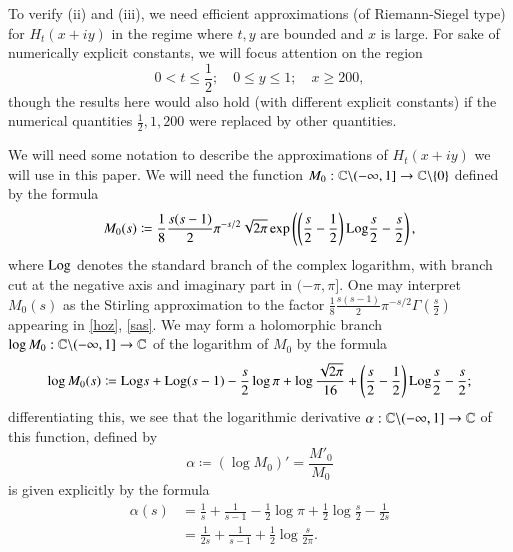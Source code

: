 To verify (ii) and (iii), we need efficient approximations (of Riemann-Siegel type) for $H_t(x+iy)$ in the regime where $t,y$ are bounded and $x$ is large.  For sake of numerically explicit constants, we will focus attention on the region
\begin{equation}\label{region}
0 < t \leq \frac{1}{2}; \quad 0 \leq y \leq 1; \quad x \geq 200,
\end{equation}
though the results here would also hold (with different explicit constants) if the numerical quantities $\frac{1}{2}, 1, 200$ were replaced by other quantities.

We will need some notation to describe the approximations of $H_t(x+iy)$ we will use in this paper.    We will need the function $M_0: \mathbb{C} \backslash (-\infty,1] \to \mathbb{C} \backslash \{0\}$ defined by the formula
\begin{equation}\label{M-def}
 M_0(s) \coloneqq \frac{1}{8} \frac{s(s-1)}{2} \pi^{-s/2} \sqrt{2\pi} \exp\left( \left(\frac{s}{2}-\frac{1}{2}\right){\operatorname{Log}} \frac{s}{2} - \frac{s}{2} \right),
\end{equation}
where ${\operatorname{Log}}$ denotes the standard branch of the complex logarithm, with branch cut at the negative axis and imaginary part in $(-\pi,\pi]$. One may interpret $M_0(s)$ as the Stirling approximation to the factor $\frac{1}{8} \frac{s(s-1)}{2} \pi^{-s/2} \Gamma\left(\frac{s}{2}\right)$ appearing in \eqref{hoz}, \eqref{sas}.  We may form a holomorphic branch $\log M_0: \mathbb{C} \backslash (-\infty,1] \to \mathbb{C}$ of the logarithm of $M_0$ by the formula
\begin{equation}\label{logM}
 \log M_0(s) \coloneqq {\operatorname{Log}} s + {\operatorname{Log}}(s-1) - \frac{s}{2} \log \pi + \log \frac{\sqrt{2\pi}}{16} + 
 \left(\frac{s}{2}-\frac{1}{2}\right){\operatorname{Log}} \frac{s}{2} - \frac{s}{2};
\end{equation}
differentiating this, we see that the logarithmic derivative $\alpha: \mathbb{C} \backslash (-\infty,1] \to \mathbb{C}$ of this function, defined by
\begin{equation}\label{alpha-def}
\alpha \coloneqq (\log M_0)' = \frac{M'_0}{M_0}
\end{equation}
is given explicitly by the formula
\begin{equation}\label{alpha-form}
\begin{split}
 \alpha(s) &= \frac{1}{s} + \frac{1}{s-1} - \frac{1}{2} \log \pi + \frac{1}{2} \log \frac{s}{2} - \frac{1}{2s} \\
&= \frac{1}{2s} + \frac{1}{s-1} + \frac{1}{2} \log \frac{s}{2\pi}.
\end{split}
\end{equation}
